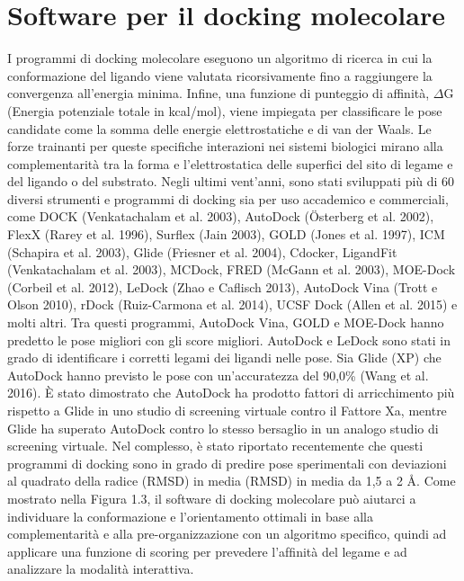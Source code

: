\section{Software per il docking molecolare}
I programmi di docking molecolare eseguono un algoritmo di ricerca in cui la conformazione del ligando viene valutata ricorsivamente fino a raggiungere la convergenza all'energia minima. Infine, una funzione di punteggio di affinità, $\Delta$G (Energia potenziale totale in kcal/mol), viene impiegata per classificare le pose candidate come la somma delle energie elettrostatiche e di van der Waals. Le forze trainanti per queste specifiche interazioni nei sistemi biologici mirano alla complementarità tra la forma e l'elettrostatica delle superfici del sito di legame e del ligando o del substrato. \newline
Negli ultimi vent'anni, sono stati sviluppati più di 60 diversi strumenti e programmi di docking sia per uso accademico e commerciali, come DOCK (Venkatachalam et al. 2003), AutoDock (Österberg et al. 2002), FlexX (Rarey et al. 1996), Surflex (Jain 2003), GOLD (Jones et al. 1997), ICM (Schapira et al. 2003), Glide (Friesner et al. 2004), Cdocker, LigandFit (Venkatachalam et al. 2003), MCDock, FRED (McGann et al. 2003), MOE-Dock (Corbeil et al. 2012), LeDock (Zhao e Caflisch 2013), AutoDock Vina (Trott e Olson 2010), rDock (Ruiz-Carmona et al. 2014), UCSF Dock (Allen et al. 2015) e molti altri. \newline 
Tra questi programmi, AutoDock Vina, GOLD e MOE-Dock hanno predetto le pose migliori con gli score migliori. AutoDock e LeDock sono stati in grado di identificare i corretti legami dei ligandi nelle pose. Sia Glide (XP) che AutoDock hanno previsto le pose con un'accuratezza del 90,0\% (Wang et al. 2016). È stato dimostrato che AutoDock ha prodotto fattori di arricchimento più rispetto a Glide in uno studio di screening virtuale contro il Fattore Xa, mentre Glide ha superato AutoDock contro lo stesso bersaglio in un analogo studio di screening virtuale. Nel complesso, è stato riportato recentemente che questi programmi di docking sono in grado di predire pose sperimentali con deviazioni al quadrato della radice (RMSD) in media (RMSD) in media da 1,5 a 2 Å\cite{pagadala2017software}.\newline 
Come mostrato nella Figura 1.3, il software di docking molecolare può aiutarci a individuare la conformazione e l'orientamento ottimali in base alla complementarità e alla pre-organizzazione con un algoritmo specifico, quindi ad applicare una funzione di scoring per prevedere l'afﬁnità del legame e ad analizzare la modalità interattiva\cite{fan2019progress}.

